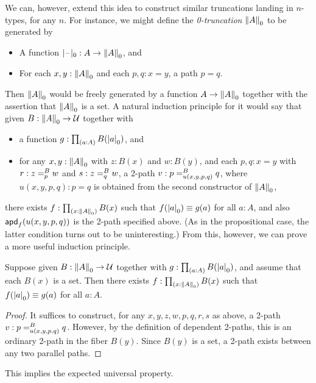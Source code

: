 %
We can, however, extend this idea to construct similar truncations landing in $n$-types, for any $n$.
For instance, we might define the \emph{0-trun\-ca\-tion} $\trunc0A$ to be generated by
\begin{itemize}
\item A function $\tprojf0 : A \to \trunc0 A$, and
\item For each $x,y:\trunc0A$ and each $p,q:x=y$, a path $p=q$.
\end{itemize}
Then $\trunc0A$ would be freely generated by a function $A\to \trunc0A$ together with the assertion that $\trunc0A$ is a set.
A natural induction principle for it would say that given $B:\trunc0 A \to \type$ together with
\begin{itemize}
\item a function $g:\prd{a:A} B(\tproj0a)$, and
\item for any $x,y:\trunc0A$ with $z:B(x)$ and $w:B(y)$, and each $p,q:x=y$ with $r:\dpath{B}{p}{z}{w}$ and $s:\dpath{B}{q}{z}{w}$, a 2-path $v:\dpath{B}{u(x,y,p,q)}{p}{q}$, where $u(x,y,p,q):p=q$ is obtained from the second constructor of $\trunc0A$,
\end{itemize}
there exists $f:\prd{x:\trunc0A} B(x)$ such that $f(\tproj0a)\jdeq g(a)$ for all $a:A$, and also $\apd{f}{u(x,y,p,q)}$ is the 2-path specified above.
(As in the propositional case, the latter condition turns out to be uninteresting.)
From this, however, we can prove a more useful induction principle.

\begin{lem}\label{thm:trunc0-ind}
  Suppose given $B:\trunc0 A \to \type$ together with $g:\prd{a:A} B(\tproj0a)$, and assume that each $B(x)$ is a set.
  Then there exists $f:\prd{x:\trunc0A} B(x)$ such that $f(\tproj0a)\jdeq g(a)$ for all $a:A$.
\end{lem}
\begin{proof}
  It suffices to construct, for any $x,y,z,w,p,q,r,s$ as above, a 2-path $v:\dpath{B}{u(x,y,p,q)}{p}{q}$.
  However, by the definition of dependent 2-paths, this is an ordinary 2-path in the fiber $B(y)$.
  Since $B(y)$ is a set, a 2-path exists between any two parallel paths.
\end{proof}

This implies the expected universal property.

